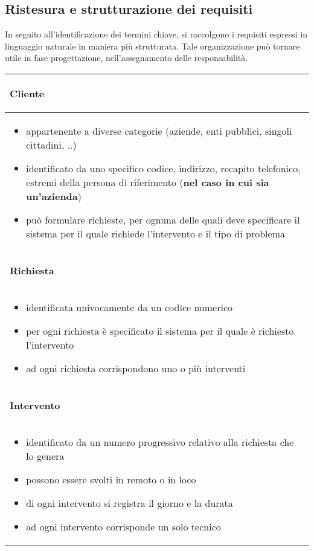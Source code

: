 \documentclass{article}
\begin{document}
\subsection{Ristesura e strutturazione dei requisiti}

In seguito all'identificazione dei termini chiave, si raccolgono i requisiti espressi in linguaggio naturale in maniera più strutturata. Tale organizzazione può tornare utile in fase progettazione, nell'assegnamento delle responsabilità.

\begin{table}[h]
    \centering
    \begin{tabular}{|m{17cm}|}
        \hline
        \begin{center} \textbf{Cliente} \end{center} \\
        \hline
        \begin{itemize}
            \item appartenente a diverse categorie (aziende, enti pubblici, singoli cittadini, ..)
            \item identificato da uno specifico codice, indirizzo, recapito telefonico, estremi della persona di riferimento (\textbf{nel caso in cui sia un'azienda})
            \item può formulare richieste, per ognuna delle quali deve specificare il sistema per il quale richiede l'intervento e il tipo di problema
        \end{itemize} \\
        
        \hline
        \begin{center}\textbf{Richiesta}\end{center} \\
        \hline
        \begin{itemize}
            \item identificata univocamente da un codice numerico
            \item per ogni richiesta è specificato il sistema per il quale è richiesto l'intervento
            \item ad ogni richiesta corrispondono uno o più interventi
        \end{itemize} \\
        
        \hline
        \begin{center}\textbf{Intervento}\end{center} \\
        \hline
        \begin{itemize}
            \item identificato da un numero progressivo relativo alla richiesta che lo genera
            \item possono essere svolti in remoto o in loco
            \item di ogni intervento si registra il giorno e la durata
            \item ad ogni intervento corrisponde un solo tecnico
        \end{itemize} \\
        

\end{tabular}
\end{table}
\end{document}
